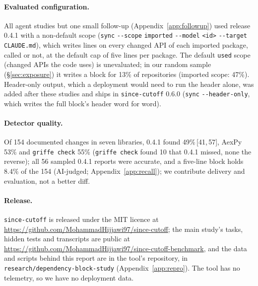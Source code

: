 \documentclass[11pt]{article}
\newcommand{\tool}{\texttt{since-cutoff}\xspace}
\newcommand{\ci}[2]{\,[#1,\,#2]}
\newcommand{\code}[1]{\texttt{#1}}
\newcommand{\flag}[1]{\texttt{-{}-#1}}%
\newcommand{\repo}{\url{https://github.com/MohammadHijjawi97/since-cutoff}}
\newcommand{\benchrepo}{\url{https://github.com/MohammadHijjawi97/since-cutoff-benchmark}}
\begin{document}
\paragraph{Evaluated configuration.}
All agent studies but one small follow-up (Appendix~\ref{app:followup}) used release 0.4.1 with a non-default scope (\code{sync} \flag{scope} \code{imported} \flag{model} \code{<id>} \flag{target} \code{CLAUDE.md}), which writes lines on every changed API of each imported package, called or not, at the default cap of five lines per package.
The default \code{used} scope (changed APIs the code uses) is unevaluated; in our random sample (\S\ref{sec:exposure}) it writes a block for 13\% of repositories (imported scope: 47\%).
Header-only output, which a deployment would need to run the header alone, was added after these studies and ships in \tool 0.6.0 (\code{sync} \flag{header-only}, which writes the full block's header word for word).

\paragraph{Detector quality.}
Of 154 documented changes in seven libraries, 0.4.1 found 49\%\ci{41}{57}, AexPy 53\% and \code{griffe check} 55\% (\code{griffe check} found 10 that 0.4.1 missed, none the reverse); all 56 sampled 0.4.1 reports were accurate, and a five-line block holds 8.4\% of the 154 (AI-judged; Appendix~\ref{app:recall}); we contribute delivery and evaluation, not a better diff.

\paragraph{Release.}
\tool is released under the MIT licence at \repo; the main study's tasks, hidden tests and transcripts are public at \benchrepo, and the data and scripts behind this report are in the tool's repository, in \code{research/dependency-block-study} (Appendix~\ref{app:repro}).
The tool has no telemetry, so we have no deployment data.
\end{document}
